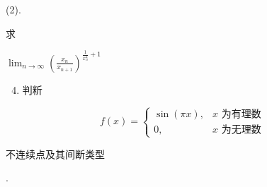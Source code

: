 \documentclass[10pt]{article}
\begin{document}
(2). \begin{CJK}{UTF8}{mj}求\end{CJK} $\lim _{n \rightarrow \infty}\left(\frac{x_{n}}{x_{n+1}}\right)^{\frac{1}{x_{n}^{2}}+1}$

\begin{enumerate}
  \setcounter{enumi}{3}
  \item \begin{CJK}{UTF8}{mj}判䉼\end{CJK}
\end{enumerate}
$$
f(x)= \begin{cases}\sin (\pi x), & x \text { 为有理数 } \\ 0, & x \text { 为无理数 }\end{cases}
$$
\begin{CJK}{UTF8}{mj}不连续点及其间断类型\end{CJK}.
\end{document}
